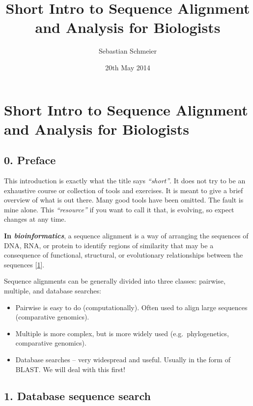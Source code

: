 \documentclass[]{article}
\begin{document}
\title{Short Intro to Sequence Alignment and Analysis for Biologists}
\author{Sebastian Schmeier}
\date{20th May 2014}
\maketitle

\section{Short Intro to Sequence Alignment and Analysis for
Biologists}\label{short-intro-to-sequence-alignment-and-analysis-for-biologists}

\subsection{0. Preface}\label{preface}

This introduction is exactly what the title says \emph{``short''}. It
does not try to be an exhaustive course or collection of tools and
exercises. It is meant to give a brief overview of what is out there.
Many good tools have been omitted. The fault is mine alone. This
\emph{``resource''} if you want to call it that, is evolving, so expect
changes at any time.

\textbf{In \emph{bioinformatics}}, a sequence alignment is a way of
arranging the sequences of DNA, RNA, or protein to identify regions of
similarity that may be a consequence of functional, structural, or
evolutionary relationships between the sequences
{[}\href{http://www.cshlpress.com/default.tpl?cart=14004538673655488\&fromlink=T\&linkaction=full\&linksortby=oop_title\&--eqSKUdatarq=466}{1}{]}.

Sequence alignments can be generally divided into three classes:
pairwise, multiple, and database searches:

\begin{itemize}
\itemsep1pt\parskip0pt
\item
  Pairwise is easy to do (computationally). Often used to align large
  sequences (comparative genomics).
\item
  Multiple is more complex, but is more widely used (e.g.~phylogenetics,
  comparative genomics).
\item
  Database searches -- very widespread and useful. Usually in the form
  of BLAST. We will deal with this first!
\end{itemize}

\subsection{1. Database sequence search}\label{database-sequence-search}
\end{document}
